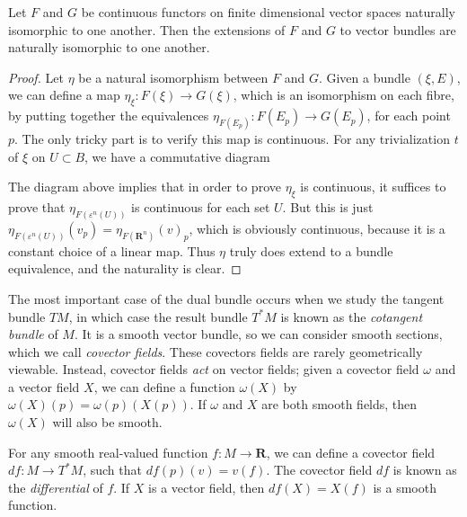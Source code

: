 \begin{theorem}
    Let $F$ and $G$ be continuous functors on finite dimensional vector spaces naturally isomorphic to one another. Then the extensions of $F$ and $G$ to vector bundles are naturally isomorphic to one another.
\end{theorem}
\begin{proof}
    Let $\eta$ be a natural isomorphism between $F$ and $G$. Given a bundle $(\xi,E)$, we can define a map $\eta_\xi: F(\xi) \to G(\xi)$, which is an isomorphism on each fibre, by putting together the equivalences $\eta_{F(E_p)}: F(E_p) \to G(E_p)$, for each point $p$. The only tricky part is to verify this map is continuous. For any trivialization $t$ of $\xi$ on $U \subset B$, we have a commutative diagram
    \begin{center}
    \end{center}
    The diagram above implies that in order to prove $\eta_\xi$ is continuous, it suffices to prove that $\eta_{F(\varepsilon^n(U))}$ is continuous for each set $U$. But this is just $\eta_{F(\varepsilon^n(U))}(v_p) = \eta_{F(\mathbf{R}^n)}(v)_p$, which is obviously continuous, because it is a constant choice of a linear map. Thus $\eta$ truly does extend to a bundle equivalence, and the naturality is clear.
\end{proof}

The most important case of the dual bundle occurs when we study the tangent bundle $TM$, in which case the result bundle $T^*M$ is known as the \emph{cotangent bundle} of $M$. It is a smooth vector bundle, so we can consider smooth sections, which we call {\it covector fields}. These covectors fields are rarely geometrically viewable. Instead, covector fields {\it act} on vector fields; given a covector field $\omega$ and a vector field $X$, we can define a function $\omega(X)$ by $\omega(X)(p) = \omega(p)(X(p))$. If $\omega$ and $X$ are both smooth fields, then $\omega(X)$ will also be smooth.

\begin{example}
    For any smooth real-valued function $f: M \to \mathbf{R}$, we can define a covector field $df: M \to T^*M$, such that $df(p)(v) = v(f)$. The covector field $df$ is known as the {\it differential} of $f$. If $X$ is a vector field, then $df(X) = X(f)$ is a smooth function.
\end{example}

